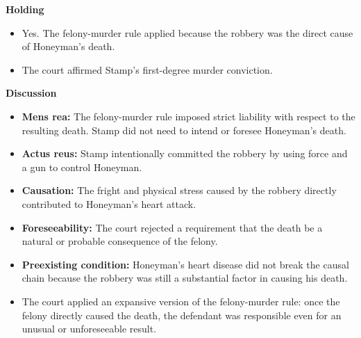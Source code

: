 \documentclass[11pt]{tex/lawoutline}
\begin{document}
{        \textbf{Holding}
        \begin{itemize}
            \item Yes. The felony-murder rule applied because the robbery was the direct cause of Honeyman's death.
            \item The court affirmed Stamp's first-degree murder conviction.
        \end{itemize}

        \textbf{Discussion}
        \begin{itemize}
            \item \textbf{Mens rea:} The felony-murder rule imposed strict liability with respect to the resulting death. Stamp did not need to intend or foresee Honeyman's death.
            \item \textbf{Actus reus:} Stamp intentionally committed the robbery by using force and a gun to control Honeyman.
            \item \textbf{Causation:} The fright and physical stress caused by the robbery directly contributed to Honeyman's heart attack.
            \item \textbf{Foreseeability:} The court rejected a requirement that the death be a natural or probable consequence of the felony.
            \item \textbf{Preexisting condition:} Honeyman's heart disease did not break the causal chain because the robbery was still a substantial factor in causing his death.
            \item The court applied an expansive version of the felony-murder rule: once the felony directly caused the death, the defendant was responsible even for an unusual or unforeseeable result.
        \end{itemize}
    }
\end{document}
